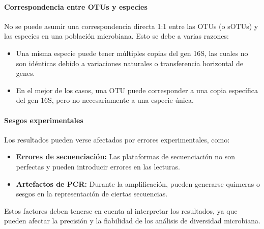 \paragraph{Correspondencia entre OTUs y especies}
No se puede asumir una correspondencia directa 1:1 entre las OTUs (o sOTUs) y las especies en una población microbiana. Esto se debe a varias razones:
\begin{itemize}
\item Una misma especie puede tener múltiples copias del gen 16S, las cuales no son idénticas debido a variaciones naturales o transferencia horizontal de genes.
\item En el mejor de los casos, una OTU puede corresponder a una copia específica del gen 16S, pero no necesariamente a una especie única.
\end{itemize}

\paragraph{Sesgos experimentales} Los resultados pueden verse afectados por errores experimentales, como:
\begin{itemize}
\item \textbf{Errores de secuenciación:} Las plataformas de secuenciación no son perfectas y pueden introducir errores en las lecturas.
\item \textbf{Artefactos de PCR:} Durante la amplificación, pueden generarse quimeras o sesgos en la representación de ciertas secuencias.
\end{itemize}

Estos factores deben tenerse en cuenta al interpretar los resultados, ya que pueden afectar la precisión y la fiabilidad de los análisis de diversidad microbiana.
